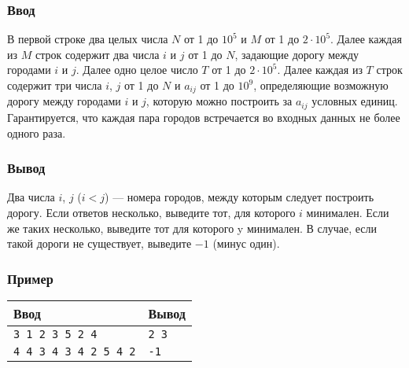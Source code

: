 \documentclass[10pt, a4paper]{article}
\newcommand{\informat}[1]
{
	\subsubsection*{Ввод} #1
}
\newcommand{\outformat}[1]
{
	\subsubsection*{Вывод} #1
}
\newcommand{\examplee}[4]
{
	\subsubsection*{Пример}
	\noindent
	\begin{center}
	\begin{tabularx}{\linewidth}{|X|X|}
	\hline
	Ввод 	& Вывод  	\\
	\hline
	{\tt #1} & {\tt #2}	\\
	\hline
	{\tt #3} & {\tt #4}	\\
	\hline
	\end{tabularx}
	\end{center}
}
\begin{document}
\informat{В первой строке два целых числа $N$ от 1 до $10^5$ и $M$ от 1 до $2 \cdot 10^5$. \newline
Далее каждая из $M$ строк содержит два числа $i$ и $j$ от 1 до $N$, задающие дорогу между городами $i$ и $j$. \newline 
Далее одно целое число $T$ от 1 до $2 \cdot 10^5$. \newline
Далее каждая из $T$ строк содержит три числа $i$, $j$ от 1 до $N$ и $a_{ij}$ от 1 до $10^9$, определяющие возможную дорогу между городами $i$ и $j$, которую можно построить за $a_{ij}$ условных единиц. Гарантируется, что каждая пара городов встречается во входных данных не более одного раза.}

\outformat{Два числа $i$, $j$ ($i < j$) --- номера городов, между которым следует построить дорогу. Если ответов несколько, выведите тот, для которого $i$ минимален. Если же таких несколько, выведите тот для которого y минимален. В случае, если такой дороги не существует, выведите $-1$ (минус один).}

\examplee
{3 1 \newline
1 2 \newline
2 \newline
1 3 5 \newline
3 2 4
}
{2 3}
{4 4 \newline
1 3 \newline
1 4 \newline
2 3 \newline
2 4 \newline
2 \newline
1 2 5 \newline
3 4 2}
{-1}
\end{document}
